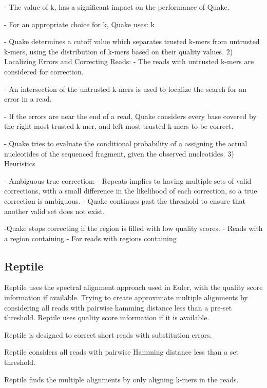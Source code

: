 \documentclass{llncs}
\begin{document}
- The value of k, has a significant impact on the performance of Quake.

- For an appropriate choice for k, Quake uses: k %

- Quake determines a cutoff value which separates trusted k-mers from untrusted k-mers, using the distribution of k-mers based on their quality values. 
2) Localizing Errors and Correcting Reads:
- The reads with untrusted k-mers are considered for correction. 

- An intersection of the untrusted k-mers is used to localize the search for an error in a read.

- If the errors are near the end of a read,  Quake considers every base covered by the right most trusted k-mer, and left most trusted k-mers to be correct.

- Quake tries to evaluate the conditional probability of a assigning the actual nucleotides of the sequenced fragment, given the observed nucleotides.
3) Heuristics

- Ambiguous true correction: 
  - Repeats implies to having multiple sets of valid corrections, with a small difference in the likelihood of
     each correction, so a true correction is ambiguous.
  - Quake continues past the threshold to ensure that another valid set does not exist. 

-Quake stops correcting if the region is filled with low quality scores.
   - Reads with a region containing %
   - For reads with regions containing %
\subsection{Reptile}
Reptile \cite{Reptile} uses the spectral alignment approach used in Euler, with the quality score information if available. Trying to create approximate multiple alignments by considering all reads with pairwise hamming distance less than a pre-set threshold. 
Reptile uses quality score information if it is available. 

Reptile is designed to correct short reads with substitution errors.

Reptile considers all reads with pairwise Hamming distance less than a set threshold. 

Reptile finds the multiple alignments by only aligning k-mers in the reads. 
\end{document}
